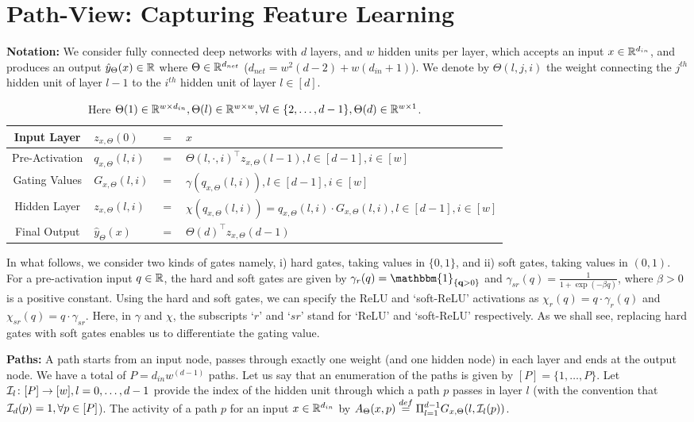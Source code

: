 \section{Path-View: Capturing Feature Learning}\label{sec:pathgate}
\textbf{Notation:} We consider fully connected deep networks with $d$ layers, and $w$ hidden units per layer, which accepts an input $x\in\mathbb{R}^{d_{in}}$, and produces an output $\hat{y}_{\Theta}(x)\in \mathbb{R}$ where $\Theta\in\mathbb{R}^{d_{net}}$ ($d_{net}=w^2(d-2)+w(d_{in}+1)$). We denote by $\Theta(l,j,i)$ the weight connecting the $j^{th}$ hidden unit of layer $l-1$ to the $i^{th}$ hidden unit of layer $l\in[d]$.
\FloatBarrier
\begin{table}[h]
\centering
\begin{tabular}{|c|lll|}\hline
Input Layer &$z_{x,\Theta}(0)$ &$=$ &$x$ \\\hline
Pre-Activation & $q_{x,\Theta}(l,i)$& $=$ & ${\Theta(l,\cdot,i)}^\top z_{x,\Theta}(l-1), l\in[d-1],i\in[w]$\\\hline
Gating Values &$G_{x,\Theta}(l,i)$& $=$ & $\gamma(q_{x,\Theta}(l,i)), l\in[d-1],i\in[w]$ \\\hline
Hidden Layer &$z_{x,\Theta}(l,i)$ & $=$ & $\chi(q_{x,\Theta}(l,i))= q_{x,\Theta}(l,i)\cdot G_{x,\Theta}(l,i), l\in[d-1],i\in[w]$ \\\hline
Final Output & $\hat{y}_{\Theta}(x)$ & $=$ & ${\Theta(d)}^\top z_{x,\Theta}(d-1)$\\\hline
\end{tabular}
\caption{Here $\Theta(1)\in\mathbb{R}^{w\times d_{in}}, \Theta(l)\in\mathbb{R}^{w\times w},\forall l\in\{2,\ldots,d-1\}, \Theta(d)\in\mathbb{R}^{w\times 1}$. }
\label{tb:basic}
\end{table}
In what follows, we consider two kinds of gates namely, i) hard gates, taking values in $\{0,1\}$, and ii) soft gates, taking values in $(0,1)$. For a pre-activation input $q\in\mathbb{R}$, the  hard and soft gates are given by $\gamma_{r}(q)=\mathbbm{1}_{\{\q>0\}}$ and $\gamma_{sr}(q)=\frac{1}{1+\exp(-\beta q)}$, where $\beta>0$ is a positive constant. Using the hard and soft gates, we can specify the ReLU and `soft-ReLU' activations as $\chi_{r}(q)=q\cdot\gamma_r(q)$ and $\chi_{sr}(q)=q\cdot\gamma_{sr}$. Here, in $\gamma$ and $\chi$, the subscripts `$r$' and `$sr$' stand for `ReLU' and `soft-ReLU' respectively. As we shall see, replacing hard gates with soft gates enables us to differentiate the gating value.

\textbf{Paths:} A path starts from an input node, passes through exactly one weight (and one hidden node) in each layer and ends at the output node. We have a total of $P=d_{in}w^{(d-1)}$ paths. Let us say that an enumeration of the paths is given by $[P]=\{1,\ldots,P\}$. Let $\mathcal{I}_{l}\colon [P]\rightarrow [w],l=0,\ldots,d-1$ provide the index of the hidden unit through which a path $p$ passes in layer $l$ (with the convention that $\mathcal{I}_d(p)=1,\forall p\in [P]$). The activity of a path $p$ for an input $x\in \mathbb{R}^{d_{in}}$ by $A_{\Theta}(x,p)\stackrel{def}{=}\Pi_{l=1}^{d-1} G_{x,\Theta}(l,\mathcal{I}_l(p))$.


